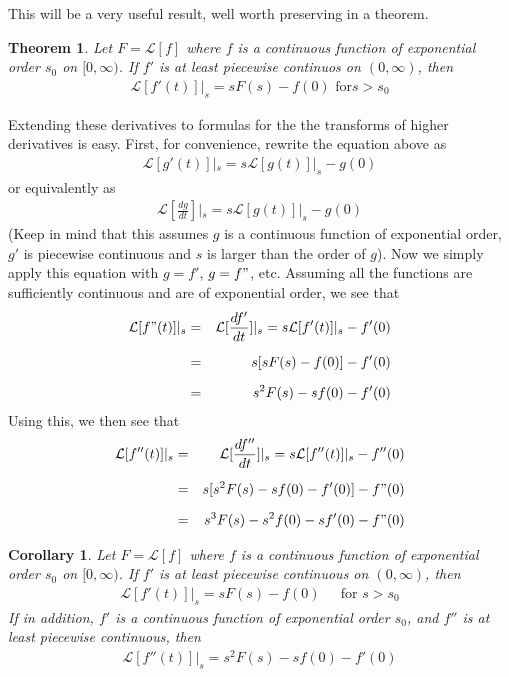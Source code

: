 \documentclass[11pt]{report}
\newtheorem{theorem}{Theorem}[chapter]
\newtheorem{corollary}{Corollary}[chapter]
\newcommand{\sps}{\\[0.2cm]}
\newcommand{\NI}{\noindent}
\begin{document}
	\NI This will be a very useful result, well worth preserving in a theorem. 
	\begin{theorem}
		Let $F = \mathcal{L}[f]$ where $f$ is a continuous function of exponential order $s_0$ on $[0, \infty)$. If $f'$ is at least piecewise continuos on $(0, \infty)$, then
		\begin{eqnarray*}
			\mathcal{L}[f'(t)]|_s = sF(s) - f(0) \text{ for} s>s_0
		\end{eqnarray*}
	\end{theorem}
	Extending these derivatives to formulas for the the transforms of higher derivatives is easy. First, for convenience, rewrite the equation above as
	\begin{eqnarray*}
		\mathcal{L}[g'(t)]|_s = s\mathcal{L}[g(t)]|_s - g(0)
	\end{eqnarray*}
	or equivalently as
	\begin{eqnarray*}
		\mathcal{L}[\frac{dg}{dt}]|_s = s\mathcal{L}[g(t)]|_s - g(0)
	\end{eqnarray*}
	(Keep in mind that this assumes $g$ is a continuous function of exponential order, $g'$ is piecewise continuous and $s$ is larger than the order of $g$). Now we simply apply this equation with $g = f'$, $g = f"$, etc. Assuming all the functions are sufficiently continuous and are of exponential order, we see that
	\begin{eqnarray*}
		\mathcal{L}[f"(t)]|_s &=& \mathcal{L}[\frac{df'}{dt}]|_s = s\mathcal{L}[f'(t)]|_s - f'(0)\sps
		&=& s[sF(s) - f(0)] - f'(0)\sps
		&=& s^2F(s) - sf(0) - f'(0)
	\end{eqnarray*}
	Using this, we then see that\\
	\begin{eqnarray*}
		\mathcal{L}[f''(t)]|_s &=& \mathcal{L}[\frac{df''}{dt}]|_s = s\mathcal{L}[f''(t)]|_s - f''(0)\sps
		&=& s[s^2F(s) - sf(0) - f'(0)] - f"(0)\sps
		&=& s^3F(s) - s^2f(0) - sf'(0) - f"(0)
	\end{eqnarray*}
	
	\begin{corollary}
		Let $F = \mathcal{L}[f]$ where $f$ is a continuous function of exponential order $s_0$ on $[0, \infty)$. If $f'$ is at least piecewise continuous on $(0, \infty)$, then
		\begin{eqnarray*}
			\mathcal{L}[f'(t)]|_s = sF(s) - f(0)~~~~~ \text{ for } s>s_0
		\end{eqnarray*}
		If in addition, $f'$ is a continuous function of exponential order $s_0$, and $f''$ is at least piecewise continuous, then
		\begin{eqnarray*}
			\mathcal{L}[f''(t)]|_s = s^2F(s) - sf(0) - f'(0)
		\end{eqnarray*}
	\end{corollary}
	
\end{document}
